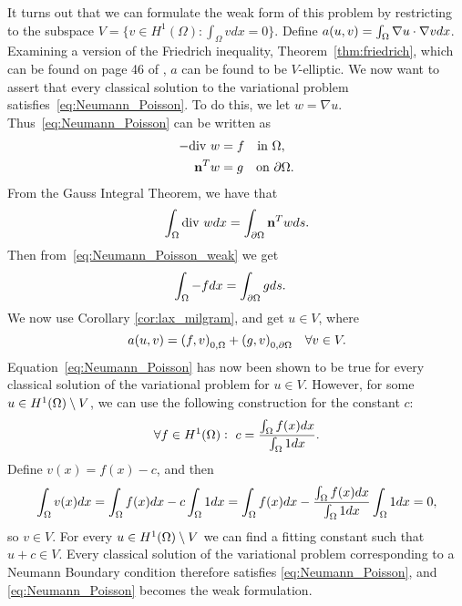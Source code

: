 It turns out that we can formulate the weak form of this problem by restricting to the subspace $V=\{v\in H^1(\Omega):\int_{\Omega}vdx=0\}.$
Define $a(u,v) = \int_\Omega \nabla u \cdot \nabla v dx$. Examining a version of 
the Friedrich inequality, Theorem~\ref{thm:friedrich}, which can be found on 
page 46 of \cite{Braess}, $a$ can be found to be $V$-elliptic.
We now want to assert that every classical solution to the variational problem satisfies~\eqref{eq:Neumann_Poisson}.
To do this, we let $w=\nabla u$. Thus~\eqref{eq:Neumann_Poisson} can be written as
\begin{align}\label{eq:Neumann_Poisson_weak}
\begin{split}
    -\text{div } w &= f \quad \text{in } \Omega, \\
    \mathbf{n}^T w &= g \quad \text{on } \partial \Omega.
\end{split}    
\end{align}
From the Gauss Integral Theorem, we have that
\[\int_{\Omega} \text{div } w dx = \int_{\partial \Omega} \mathbf{n}^T w ds.\]
Then from~\eqref{eq:Neumann_Poisson_weak} we get
\begin{align}
\begin{split}
\int_{\Omega} -f dx &= \int_{\partial \Omega} g ds.
\end{split}
\end{align}
We now use Corollary \ref{cor:lax_milgram}, and get $u\in V$, where
\begin{equation}\label{eq:Lax-Milgram_Neumann}
  a(u,v) = {(f,v)}_{0,\Omega} + {(g,v)}_{0,\partial \Omega} \quad \forall v\in V.  
\end{equation}
Equation~\eqref{eq:Neumann_Poisson} has now been shown to be true for 
every classical solution of the variational problem for $u\in V$. However, for some 
$u\in H^1(\Omega)\setminus V$, we can use the following construction for 
the constant $c$:
\begin{equation*}
    \forall f \in H^1(\Omega): \,\, c = \frac{\int_\Omega f(x) dx }{\int_\Omega 1 dx}.
\end{equation*}
Define $v(x) = f(x) - c$, and then 
\begin{equation*}
    \int_\Omega v(x)dx = \int_\Omega f(x) dx - c\int_\Omega 1 dx = \int_\Omega f(x) dx - \frac{\int_\Omega f(x) dx }{\int_\Omega 1 dx} \int_\Omega 1 dx = 0,
\end{equation*}
so $v \in V$. For every $u\in H^1(\Omega)\setminus V$ we can find a fitting 
constant such that $u+c \in V$. Every classical solution of the 
variational problem corresponding to a Neumann Boundary condition therefore 
satisfies \eqref{eq:Neumann_Poisson}, and \eqref{eq:Neumann_Poisson} becomes the weak formulation.
